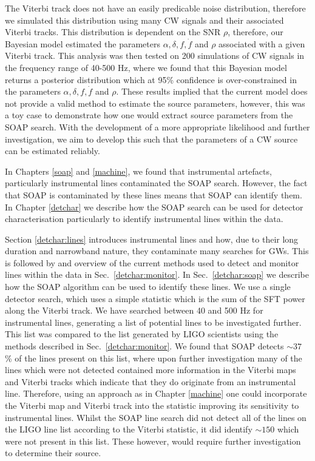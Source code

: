 The Viterbi track does not have an easily predicable noise distribution, therefore we simulated this distribution using many \gls{CW} signals and their associated Viterbi tracks.
This distribution is dependent on the \gls{SNR} $\rho$, therefore, our Bayesian model estimated the parameters $\alpha, \delta, f, \dot{f}$ and $\rho$ associated with a given Viterbi track.
This analysis was then tested on 200 simulations of \gls{CW} signals in the frequency range of 40-500 Hz, where we found that this Bayesian model returns a posterior distribution which at 95\% confidence is over-constrained in the parameters $\alpha,\delta,f,\dot{f}$ and $\rho$.
These results implied that the current model does not provide a valid method to estimate the source parameters, however, this was a toy case to demonstrate how one would extract source parameters from the SOAP search.
With the development of a more appropriate likelihood and further investigation, we aim to develop this such that the parameters of a \gls{CW} source can be estimated reliably. 

\bigskip

In Chapters \ref{soap} and \ref{machine}, we found that instrumental artefacts, particularly instrumental lines contaminated the SOAP search.
However, the fact that SOAP is contaminated by these lines means that SOAP can identify them.
In Chapter \ref{detchar} we describe how the SOAP search can be used for detector characterisation particularly to identify instrumental lines within the data.

Section \ref{detchar:lines} introduces instrumental lines and how, due to their long duration and narrowband nature, they contaminate many searches for \glspl{GW}. 
This is followed by and overview of the current methods used to detect and monitor lines within the data in Sec.~\ref{detchar:monitor}.
In Sec.~\ref{detchar:soap} we describe how the SOAP algorithm can be used to identify these lines.
We use a single detector search, which uses a simple statistic which is the sum of the \gls{SFT} power along the Viterbi track. 
We have searched between 40 and 500 Hz for instrumental lines, generating a list of potential lines to be investigated further.
This list was compared to the list generated by \gls{LIGO} scientists using the methods described in Sec.~\ref{detchar:monitor}.
We found that SOAP detects $\sim 37$ \% of the lines present on this list, where upon further investigation many of the lines which were not detected contained more information in the Viterbi maps and Viterbi tracks which indicate that they do originate from an instrumental line.
Therefore, using an approach as in Chapter \ref{machine} one could incorporate the Viterbi map and Viterbi track into the statistic improving its sensitivity to instrumental lines.
Whilst the SOAP line search did not detect all of the lines on the \gls{LIGO} line list according to the Viterbi statistic, it did identify $\sim 150$ which were not present in this list.
These however, would require further investigation to determine their source.

